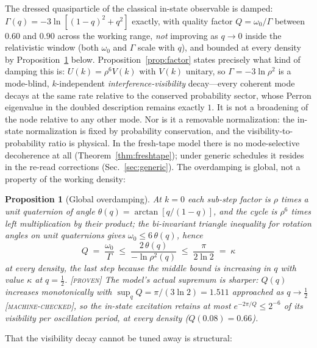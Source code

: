 \documentclass[aps,prd,twocolumn,superscriptaddress,nofootinbib,floatfix]{revtex4-2}
\newtheorem{proposition}{Proposition}
\newcommand{\evP}{\textnormal{\textsc{[proven]}}}
\newcommand{\evM}{\textnormal{\textsc{[machine-checked]}}}
\begin{document}
The dressed quasiparticle of the classical in-state observable is damped:
$\Gamma(q)=-3\ln[(1-q)^2+q^2]$ exactly, with quality factor
$Q=\omega_0/\Gamma$ between $0.60$ and $0.90$ across the working range,
\emph{not} improving as $q\to0$ inside the relativistic window (both
$\omega_0$ and $\Gamma$ scale with $q$), and bounded at every density
by Proposition~\ref{prop:qglobal} below. Proposition~\ref{prop:factor}
states precisely what kind of damping this is: $U(k)=\rho^6V(k)$ with
$V(k)$ unitary, so $\Gamma=-3\ln\rho^2$ is a
mode-blind, $k$-independent \emph{interference-visibility} decay---every
coherent mode decays at the same rate relative to the conserved
probability sector, whose Perron eigenvalue in the doubled description
remains exactly $1$. It is not a broadening of the node relative to any
other mode. Nor is it a removable normalization: the in-state
normalization is fixed by probability conservation, and the
visibility-to-probability ratio is physical. In the fresh-tape model
there is no mode-selective decoherence at all
(Theorem~\ref{thm:freshtape}); under generic schedules it resides in
the re-read corrections (Sec.~\ref{sec:generic}). The overdamping is
global, not a property of the working density:

\begin{proposition}[Global overdamping]\label{prop:qglobal}
At $k=0$ each sub-step factor is $\rho$ times a unit quaternion of
angle $\theta(q)=\arctan[q/(1-q)]$, and the cycle is $\rho^6$ times
left multiplication by their product; the bi-invariant triangle
inequality for rotation angles on unit quaternions gives
$\omega_0\le6\,\theta(q)$, hence
\begin{equation}
Q\;=\;\frac{\omega_0}{\Gamma}\;\le\;\frac{2\,\theta(q)}{-\ln\rho^2(q)}
\;\le\;\frac{\pi}{2\ln2}\;=\;\kappa
\label{eq:qglobal}
\end{equation}
at every density, the last step because the middle bound is increasing
in $q$ with value $\kappa$ at $q=\tfrac12$. \evP{} The model's actual
supremum is sharper: $Q(q)$ increases monotonically with
$\sup_qQ=\pi/(3\ln2)=1.511$ approached as $q\to\tfrac12$ \evM{}, so
the in-state excitation retains at most $e^{-2\pi/Q}\le2^{-6}$ of its
visibility per oscillation period, at every density
($Q(0.08)=0.66$).
\end{proposition}

That the visibility
decay cannot be tuned away is structural:
\end{document}
